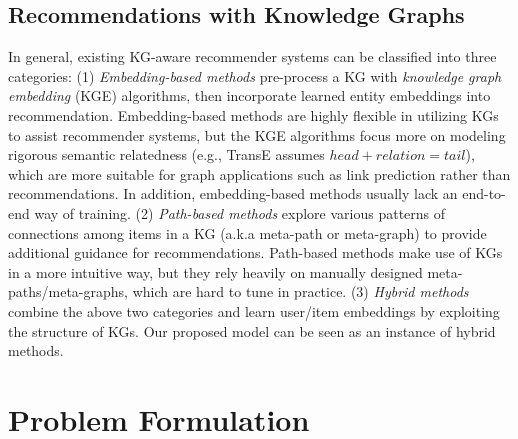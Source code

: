 \documentclass[sigconf]{acmart}
\begin{document}
	\subsection{Recommendations with Knowledge Graphs}
	\label{sec:kg_rs}
		In general, existing KG-aware recommender systems can be classified into three categories:
		(1) \textit{Embedding-based methods} \cite{zhang2016collaborative,wang2018dkn,huang2018improving,wang2019multi} pre-process a KG with \textit{knowledge graph embedding} (KGE) \cite{wang2017knowledge} algorithms, then incorporate learned entity embeddings into recommendation.
		Embedding-based methods are highly flexible in utilizing KGs to assist recommender systems, but the KGE algorithms focus more on modeling rigorous semantic relatedness (e.g., TransE \cite{bordes2013translating} assumes $head + relation = tail$), which are more suitable for graph applications such as link prediction rather than recommendations.
		In addition, embedding-based methods usually lack an end-to-end way of training.
		(2) \textit{Path-based methods} \cite{yu2014personalized,zhao2017meta,hu2018leveraging} explore various patterns of connections among items in a KG (a.k.a meta-path or meta-graph) to provide additional guidance for recommendations.
		Path-based methods make use of KGs in a more intuitive way, but they rely heavily on manually designed meta-paths/meta-graphs, which are hard to tune in practice.
		(3) \textit{Hybrid methods} \cite{wang2018ripple,sun2018recurrent,wang2019knowledge} combine the above two categories and learn user/item embeddings by exploiting the structure of KGs.
		Our proposed model can be seen as an instance of hybrid methods.
	
	
	
\section{Problem Formulation}
	\label{section:pf}
		
\end{document}
